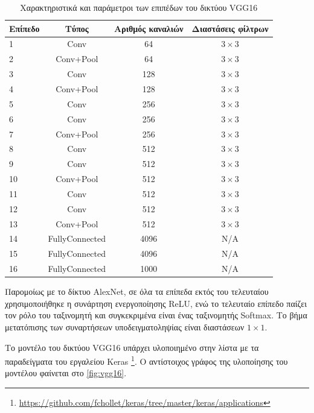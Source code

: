 \begin{table}[H]
  \begin{center}
    \caption{Χαρακτηριστικά και παράμετροι των επιπέδων του δικτύου VGG16}
    \label{tab:vgg16_layers}
    \begin{tabular}{ | l | c | c | c | }
      \hline
      \rowcolor{Gray}
      Επίπεδο  & Τύπος & Αριθμός καναλιών & Διαστάσεις φίλτρων \\
      \hline
      1 & Conv & 64 & $3 \times 3$ \\
      2 & Conv+Pool & 64 & $3 \times 3$ \\
      3 & Conv & 128 & $3 \times 3$ \\
      4 & Conv+Pool & 128 & $3 \times 3$ \\
      5 & Conv & 256 & $3 \times 3$ \\
      6 & Conv & 256 & $3 \times 3$ \\
      7 & Conv+Pool & 256 & $3 \times 3$ \\
      8 & Conv & 512 & $3 \times 3$ \\
      9 & Conv & 512 & $3 \times 3$ \\
      10 & Conv+Pool & 512 & $3 \times 3$ \\
      11 & Conv & 512 & $3 \times 3$ \\
      12 & Conv & 512 & $3 \times 3$ \\
      13 & Conv+Pool & 512 & $3 \times 3$ \\
      14 & FullyConnected & 4096 & Ν/A \\
      15 & FullyConnected & 4096 & N/A \\
      16 & FullyConnected & 1000 & N/A \\
      \hline
    \end{tabular}
  \end{center}
\end{table}

Παρομοίως με το δίκτυο AlexNet, σε όλα τα επίπεδα εκτός του τελευταίου χρησιμοποιήθηκε η συνάρτηση ενεργοποίησης
ReLU, ενώ το τελευταίο επίπεδο παίζει τον ρόλο του ταξινομητή και συγκεκριμένα
είναι ένας ταξινομητής Softmax. Το βήμα μετατόπισης των συναρτήσεων υποδειγματοληψίας
είναι διαστάσεων $1 \times 1$.

Το μοντέλο του δικτύου VGG16 υπάρχει υλοποιημένο στην λίστα με τα παραδείγματα
του εργαλείου Keras \footnote{\url{https://github.com/fchollet/keras/tree/master/keras/applications}}.
Ο αντίστοιχος γράφος της υλοποίησης του μοντέλου
φαίνεται στο \autoref{fig:vgg16}.

